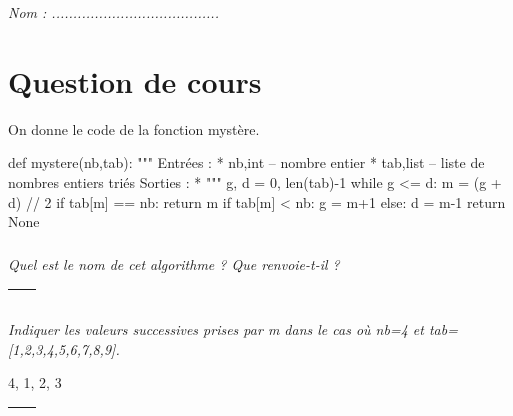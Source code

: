 \documentclass[10pt]{article}
\newif\ifprof
\begin{document}


\ifprof
\begin{center}
\large{\textit{Éléments de corrigé}}
\end{center}
\else
\begin{flushright}
\large{\textsl{Nom : .......................................}}
\end{flushright}

\vspace{1cm}
\fi


\section*{Question de cours}
\ifprof
\else
On donne le code de la fonction mystère.

\begin{py}
\begin{python}
def mystere(nb,tab):
    """ 
    Entrées : 
        * nb,int -- nombre entier
        * tab,list -- liste de nombres entiers triés
    Sorties : 
        * 
    """
    g, d = 0, len(tab)-1
    while g <= d:
        m = (g + d) // 2
        if tab[m] == nb:
            return m
        if tab[m] < nb:
            g = m+1
        else:
            d = m-1
    return None
\end{python}
\end{py}
\fi

\subparagraph{}
\textit{Quel est le nom de cet algorithme ? Que renvoie-t-il ?}
\ifprof
\begin{corrige}
Il s'agit de l'algorithme de recherche d'un nombre par dichotomie dans une liste triée. 
Il renvoie l'index du nombre recherché si le nombre existe dans la liste. Il renvoie \textsf{None} si le nombre est absent.
\end{corrige}
\else

\begin{tabular}{|p{}|}
\hline
$$\quad$$
\vspace{1cm}
$$\quad$$ \\
\hline
\end{tabular}
\fi

\subparagraph{}
\textit{Indiquer les valeurs successives prises par \textsf{m} dans le cas où \textsf{nb=4} et 
\textsf{tab=[1,2,3,4,5,6,7,8,9]}.}
\ifprof
\begin{corrige}
4, 1, 2, 3
\end{corrige}
\else

\begin{tabular}{|p{}|}
\hline
$$\quad$$
$$\quad$$ \\
\hline
\end{tabular}
\end{document}
